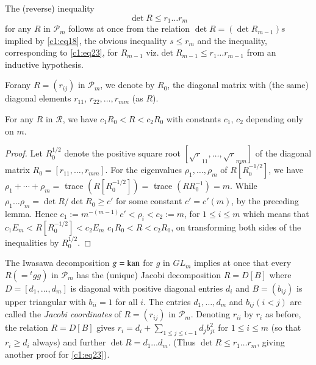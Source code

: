 \begin{remark*}
The (reverse) inequality
\begin{equation*}
\det R\leq r_{1}\ldots r_{m}\tag{23}\label{c1:eq23}
\end{equation*}
for any $R$ in $\mathscr{P}_{m}$ follows at once from the relation
$\det R=(\det R_{m-1})s$ implied by \eqref{c1:eq18}, the obvious
inequality $s\leq r_{m}$ and the inequality, corresponding to
\eqref{c1:eq23}, for $R_{m-1}$ viz.\@ $\det R_{m-1}\leq r_{1}\ldots
r_{m-1}$ from an inductive hypothesis.
\end{remark*}

For\pageoriginale any $R=(r_{ij})$ in $\mathscr{P}_{m}$, we denote by
$R_{0}$, the diagonal matrix with (the same) diagonal elements
$r_{11}$, $r_{22},\ldots,r_{mm}$ (as $R$).

\begin{sublemma}\label{c1:lem-1.3.3}
For any $R$ in $\mathscr{R}$, we have $c_{1}R_{0}<R<c_{2}R_{0}$ with
constants $c_{1}$, $c_{2}$ depending only on $m$.
\end{sublemma}

\begin{proof}
Let $R^{1/2}_{0}$ denote the positive square root
$[\sqrt{r}_{11},\ldots,\sqrt{r}_{mm}]$ of the diagonal matrix
$R_{0}=[r_{11},\ldots,r_{mm}]$. For the eigenvalues
$\rho_{1},\ldots,\rho_{m}$ of $R[R^{-1/2}_{0}]$, we have
$\rho_{1}+\cdots+\rho_{m}=$ trace $(R[R^{-1/2}_{0}])=$ trace
$(RR^{-1}_{0})=m$. While $\rho_{1}\ldots \rho_{m}=\det R/\det
R_{0}\geq c'$ for some constant $c'=c'(m)$, by the preceding
lemma. Hence $c_{1}:= m^{-(m-1)} c'<\rho_{i}<c_{2}:=m$, for $1\leq i\leq
m$ which means that $c_{1}E_{m}<R[R^{-1/2}_{0}]<c_{2}E_{m}$ \ie
$c_{1}R_{0}<R<c_{2}R_{0}$, on transforming both sides of the
inequalities by $R^{1/2}_{0}$.
\end{proof}

The Iwasawa decomposition $g=\operatorname{kan}$ for $g$ in $GL_{m}$ implies at once
that every $R(={}^{t}gg)$ in $\mathscr{P}_{m}$ has the (unique) Jacobi
decomposition $R=D[B]$ where $D=[d_{1},\ldots,d_{m}]$ is diagonal with
positive diagonal entries $d_{i}$ and $B=(b_{ij})$ is upper triangular
with $b_{ii}=1$ for all $i$. The entries $d_{1},\ldots,d_{m}$ and
$b_{ij}(i<j)$ are called the {\em Jacobi coordinates} of $R=(r_{ij})$
in $\mathscr{P}_{m}$. Denoting $r_{ii}$ by $r_{i}$ as before, the
relation $R=D[B]$ gives $r_{i}=d_{i}+\sum\limits_{1\leq j\leq
  i-1}d_{j}b^{2}_{ji}$ for $1\leq i\leq m$ (so that $r_{i}\geq d_{i}$
always) and further $\det R=d_{1}\ldots d_{m}$. (Thus $\det R\leq
r_{1}\ldots r_{m}$, giving another proof for \eqref{c1:eq23}).


